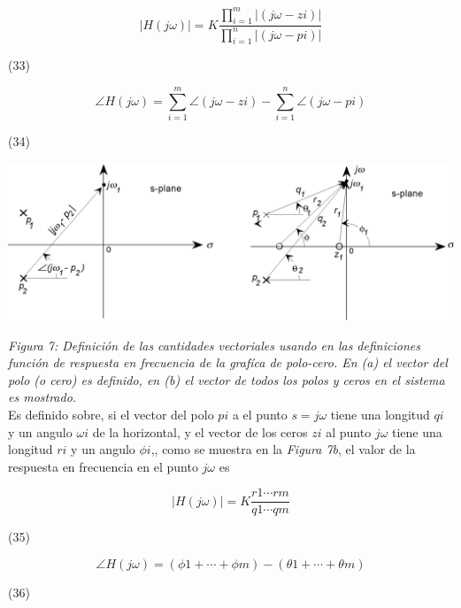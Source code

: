 \documentclass[10pt,a4paper]{article}
\begin{document}
\begin{center}
  \[|H(j\omega)|=K\frac{\prod_{i=1}^m |(j\omega-z{\scriptscriptstyle i})|}{\prod_{i=1}^n |(j\omega-p{\scriptscriptstyle i})|}\]
  \begin{minipage}{0.9\textwidth}
    \begin{flushright}
      (33)
    \end{flushright}
  \end{minipage}
  \[\angle H(j\omega) = \sum_{i=1}^m \angle(j\omega-z{\scriptscriptstyle i}) - \sum_{i=1}^n \angle(j\omega-p{\scriptscriptstyle i})\]
  \begin{minipage}{0.9\textwidth}
    \begin{flushright}
      (34)
    \end{flushright}
  \end{minipage}
\end{center}
\clearpage
\begin{center}
  \includegraphics[scale=0.25]{img/figura7.png}
\end{center}
\textit{Figura 7: Definición de las cantidades vectoriales usando en las definiciones función de respuesta en frecuencia de la grafíca de polo-cero. En (a) el vector del polo (o cero) es definido, en (b) el vector de todos los polos y ceros en el sistema es mostrado.}
\\
\vspace{0.15cm}
Es definido sobre, si el vector del polo $p{\scriptscriptstyle i}$ a el punto $s=j\omega$ tiene una longitud $q{\scriptscriptstyle i}$ y un angulo $\omega{\scriptscriptstyle i}$ de la horizontal, y el vector de los ceros $z{\scriptscriptstyle i}$ al punto $j\omega$ tiene una longitud $r{\scriptscriptstyle i}$ y un angulo $\phi{\scriptscriptstyle i}$,, como se muestra en la \textit{Figura 7b}, el valor de la respuesta en frecuencia en el punto $j\omega$ es
\begin{center}
  \[|H(j\omega)|=K\frac{r{\scriptscriptstyle 1}\cdots r{\scriptscriptstyle m}}{q{\scriptscriptstyle 1}\cdots q{\scriptscriptstyle m}}\]
  \begin{minipage}{0.9\textwidth}
    \begin{flushright}
      (35)
    \end{flushright}
  \end{minipage}
  \[\angle H(j\omega)=(\phi{\scriptscriptstyle 1}+\cdots +\phi{\scriptscriptstyle m})-(\theta{\scriptscriptstyle 1}+\cdots +\theta{\scriptscriptstyle m})\]
  \begin{minipage}{0.9\textwidth}
    \begin{flushright}
      (36)
    \end{flushright}
  \end{minipage}
\end{center}
\end{document}
